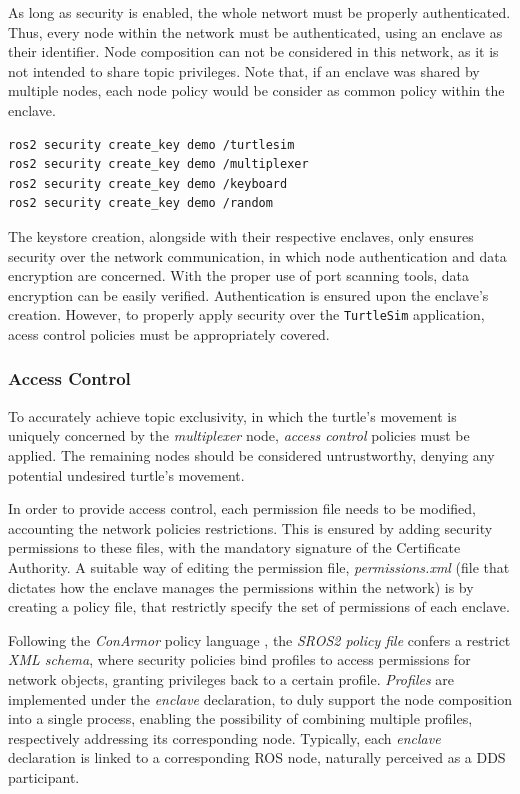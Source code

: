 As long as security is enabled, the whole networt must be properly authenticated. Thus, every node within the network must be authenticated, using an enclave as their identifier. Node composition can not be considered in this network, as it is not intended to share topic privileges. Note that, if an enclave was shared by multiple nodes, each node policy would be consider as common policy within the enclave.

\begin{lstlisting}[title={\texttt{TurtleSim} enclave creation.}]
ros2 security create_key demo /turtlesim
ros2 security create_key demo /multiplexer
ros2 security create_key demo /keyboard
ros2 security create_key demo /random
\end{lstlisting}

The keystore creation, alongside with their respective enclaves, only ensures security over the network communication, in which node authentication and data encryption are concerned. With the proper use of port scanning tools, data encryption can be easily verified. Authentication is ensured upon the enclave's creation. However, to properly apply security over the \texttt{TurtleSim} application, acess control policies must be appropriately covered.

\subsubsection{Access Control}

To accurately achieve topic exclusivity, in which the turtle's movement is uniquely concerned by the \textit{multiplexer} node, \textit{access control} policies must be applied. The remaining nodes should be considered untrustworthy, denying any potential undesired turtle's movement.
            
In order to provide access control, each permission file needs to be modified, accounting the network policies restrictions. This is ensured by adding security permissions to these files, with the mandatory signature of the Certificate Authority. A suitable way of editing the permission file, \textit{permissions.xml} (file that dictates how the enclave manages the permissions within the network) is by creating a policy file, that restrictly specify the set of permissions of each enclave.

Following the \textit{ConArmor} policy language \cite{white2018procedurally}, the \textit{SROS2 policy file} confers a restrict \textit{XML schema}, where security policies bind profiles to access permissions for network objects, granting privileges back to a certain profile. \textit{Profiles} are implemented under the \textit{enclave} declaration, to duly support the node composition into a single process, enabling the possibility of combining multiple profiles, respectively addressing its corresponding node. Typically, each \textit{enclave} declaration is linked to a corresponding ROS node, naturally perceived as a DDS participant. 

